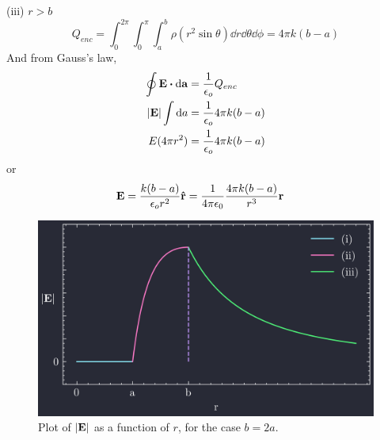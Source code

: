 \documentclass[../main.tex]{subfiles}
\begin{document}
(iii) \(r>b\)
\[ Q_{enc} = \int_0^{2\pi} \int_0^\pi \int_a^b \rho (r^2 \sin\theta) \dd{r} \dd{\theta} \dd{\phi}
= 4\pi k (b - a) \]
And from Gauss's law,
\begin{align*}
    \oint \vb{E} \vdot \dd{\vb{a}} &= \frac{1}{\epsilon_o} Q_{enc} \\
    \abs{\vb{E}} \int \dd{a} &= \frac{1}{\epsilon_o} 4\pi k (b - a) \\
    E (4\pi r^2) &= \frac{1}{\epsilon_o} 4\pi k (b - a)
\end{align*}
or
\begin{align*}
    \vb{E} &= \frac{k (b - a)}{\epsilon_o r^2} \vu{r} = \frac{1}{4\pi\epsilon_0} \frac{4\pi k(b - a)}{r^3} \vb{r}
\end{align*}
\begin{figure}[ht]
    \centering
    \includegraphics[width=0.8\linewidth]{images/hw2_15.png}
    \captionsetup{width=0.8\linewidth}
    \caption{Plot of $\abs{\vb{E}}$ as a function of $r$, for the case $b = 2a$.}
    \label{fig:2_15}
\end{figure}

\clearpage
\newpage
\end{document}
